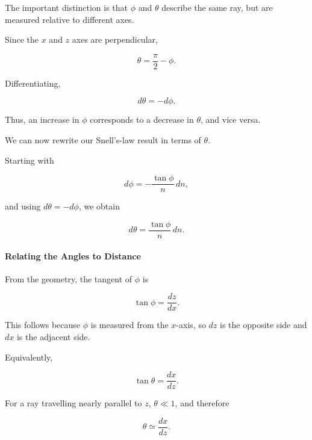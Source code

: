 The important distinction is that $\phi$ and
$\theta$ describe the same ray, but are measured
relative to different axes.

Since the $x$ and $z$ axes are perpendicular,

\begin{equation}
\boxed{
\theta=\frac{\pi}{2}-\phi.
}
\end{equation}

Differentiating,

\begin{equation}
\boxed{d\theta=-d\phi.}
\end{equation}

Thus, an increase in $\phi$ corresponds to a
decrease in $\theta$, and vice versa.

We can now rewrite our Snell's-law result
in terms of $\theta$.

Starting with

\begin{equation}
d\phi=-\frac{\tan\phi}{n}\,dn,
\end{equation}

and using $d\theta=-d\phi$, we obtain

\begin{equation}
d\theta=\frac{\tan\phi}{n}\,dn.
\end{equation}

\paragraph{Relating the Angles to Distance}

From the geometry, the tangent of $\phi$ is

\begin{equation}
\boxed{
\tan\phi=\frac{dz}{dx}.
}
\end{equation}

This follows because $\phi$ is measured from
the $x$-axis, so $dz$ is the opposite side
and $dx$ is the adjacent side.

Equivalently,

\begin{equation}
\tan\theta=\frac{dx}{dz}.
\end{equation}

For a ray travelling nearly parallel to $z$,
$\theta\ll 1$, and therefore

\begin{equation}
\theta\simeq\frac{dx}{dz}.
\end{equation}

